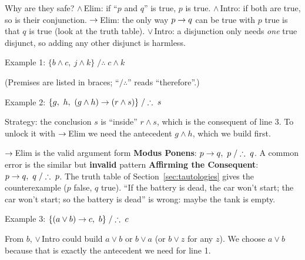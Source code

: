 Why are they safe? $\land$\,Elim: if ``$p$ and $q$'' is true, $p$ is true. $\land$\,Intro:
if both are true, so is their conjunction. $\rightarrow$\,Elim: the only way $p \rightarrow q$ can be
true with $p$ true is that $q$ is true (look at the truth table). $\lor$\,Intro: a
disjunction only needs \emph{one} true disjunct, so adding any other disjunct is harmless.

\begin{nbexample}{Example 1: $\{b \land c,\ j \land k\} \;/\therefore\; c \land k$}
\begin{fitchproof}
 \RPrem
{} \RPrem
{} 
 
 
\end{fitchproof}
(Premises are listed in braces; ``$/\therefore$'' reads ``therefore''.)
\end{nbexample}

\begin{nbexample}{Example 2: $\{g,\ h,\ (g \land h) \rightarrow (r \land s)\} \;/\therefore\; s$}
\begin{fitchproof}
 \RPrem
{} \RPrem
{} \RPrem
{} 
 
 
\end{fitchproof}
Strategy: the conclusion $s$ is ``inside'' $r \land s$, which is the consequent of line 3.
To unlock it with $\rightarrow$\,Elim we need the antecedent $g \land h$, which we build first.
\end{nbexample}

\begin{nbwarning}
$\rightarrow$\,Elim is the valid argument form \textbf{Modus Ponens}: $p \rightarrow q,\ p \;/\therefore\; q$.
A common error is the similar but \textbf{invalid} pattern \textbf{Affirming the
Consequent}: $p \rightarrow q,\ q \;/\therefore\; p$. The truth table of
Section~\ref{sec:tautologies} gives the counterexample ($p$ false, $q$ true).
``If the battery is dead, the car won't start; the car won't start; so the battery is
dead'' is wrong: maybe the tank is empty.
\end{nbwarning}

\begin{nbexample}{Example 3: $\{(a \lor b) \limp c,\ b\} \;/\therefore\; c$}
\begin{fitchproof}
 \RPrem
{} \RPrem
{} 
 
\end{fitchproof}
From $b$, $\lor$\,Intro could build $a \lor b$ or $b \lor a$ (or $b \lor z$ for any $z$). We
choose $a \lor b$ because that is exactly the antecedent we need for line 1.
\end{nbexample}

